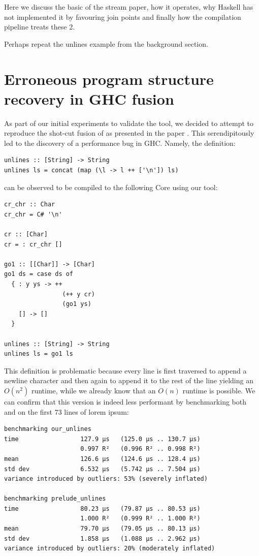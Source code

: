Here we discuss the basic of the stream paper, how it operates, why Haskell has not implemented it by favouring join points and
finally how the compilation pipeline treats these 2.

Perhaps repeat the unlines example from the background section.

\section{Erroneous program structure recovery in GHC fusion}
As part of our initial experiments to validate the tool, we decided to attempt to reproduce the shot-cut fusion of  as presented
in the paper \cite{shortcut_fusion}. This serendipitously led to the discovery of a performance bug in GHC. Namely, the definition:

\begin{listing}[H]
\begin{verbatim}
unlines :: [String] -> String
unlines ls = concat (map (\l -> l ++ ['\n']) ls)
\end{verbatim}
\end{listing}

can be observed to be compiled to the following Core using our tool:

\begin{listing}[H]
\begin{verbatim}
cr_chr :: Char
cr_chr = C# '\n'

cr :: [Char]
cr = : cr_chr []

go1 :: [[Char]] -> [Char]
go1 ds = case ds of
  { : y ys -> ++
                (++ y cr)
                (go1 ys)
    [] -> []
  }

unlines :: [String] -> String
unlines ls = go1 ls
\end{verbatim}
\end{listing}

This definition is problematic because every line is first traversed to append a newline character and then again to append it to the rest of the line
yielding an $O(n^2)$ runtime, while we already know that an $O(n)$ runtime is possible. We can confirm that this version is indeed less performant by
benchmarking both  and  on the first 73 lines of lorem ipsum:

\begin{listing}[H]
\begin{verbatim}
benchmarking our_unlines
time                 127.9 μs   (125.0 μs .. 130.7 μs)
                     0.997 R²   (0.996 R² .. 0.998 R²)
mean                 126.6 μs   (124.6 μs .. 128.4 μs)
std dev              6.532 μs   (5.742 μs .. 7.504 μs)
variance introduced by outliers: 53% (severely inflated)

benchmarking prelude_unlines
time                 80.23 μs   (79.87 μs .. 80.53 μs)
                     1.000 R²   (0.999 R² .. 1.000 R²)
mean                 79.70 μs   (79.05 μs .. 80.13 μs)
std dev              1.858 μs   (1.088 μs .. 2.962 μs)
variance introduced by outliers: 20% (moderately inflated)
\end{verbatim}
\end{listing}

